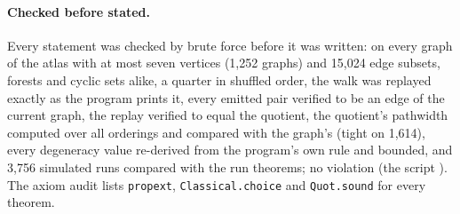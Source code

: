 \paragraph{Checked before stated.} Every statement was checked by brute
force before it was written: on every graph of the atlas with at most seven
vertices (1,252 graphs) and 15,024 edge subsets, forests and cyclic sets
alike, a quarter in shuffled order, the walk was replayed exactly as the
program prints it, every emitted pair verified to be an edge of the current
graph, the replay verified to equal the quotient, the quotient's pathwidth
computed over all orderings and compared with the graph's (tight on 1,614),
every degeneracy value re-derived from the program's own rule and bounded,
and 3,756 simulated runs compared with the run theorems; no violation
(the script ). The axiom audit lists
\texttt{propext}, \texttt{Classical.choice} and \texttt{Quot.sound} for every
theorem.

